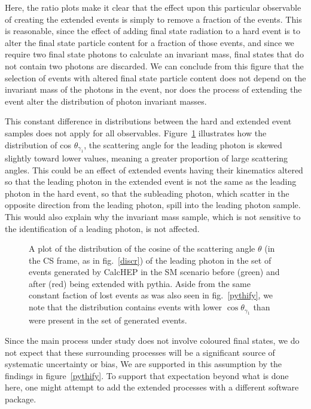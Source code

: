 Here, the ratio plots make it clear that the effect upon this particular observable of creating the extended events is simply to remove a fraction of the events. This is reasonable, since the effect of adding final state radiation to a hard event is to alter the final state particle content for a fraction of those events, and since we require two final state photons to calculate an invariant mass, final states that do not contain two photons are discarded. We can conclude from this figure that the selection of events with altered final state particle content does not depend on the invariant mass of the photons in the event, nor does the process of extending the event alter the distribution of photon invariant masses.

This constant difference in distributions between the hard and extended event samples does not apply for all observables. Figure~\ref{pythicos} illustrates how the distribution of cos $\theta_{\gamma_1}$, the scattering angle for the leading photon is skewed slightly toward lower values, meaning a greater proportion of large scattering angles. This could be an effect of extended events having their kinematics altered so that the leading photon in the extended event is not the same as the leading photon in the hard event, so that the subleading photon, which scatter in the opposite direction from the leading photon, spill into the leading photon sample. This would also explain why the invariant mass sample, which is not sensitive to the identification of a leading photon, is not affected.

\begin{figure}[htp]
\begin{minipage}[b]{.65\textwidth}
\begin{infilsf} \tiny \makebox[0pt][l]{
\hspace{-1em}
}\end{infilsf}
\end{minipage}
\hfill\begin{minipage}[b]{.3\textwidth}
\caption{A plot of the distribution of the cosine of the scattering angle $\theta$ (in the CS frame, as in fig.~\ref{discr}) of the leading photon in the set of events generated by CalcHEP in the SM scenario before (green) and after (red) being extended with pythia. Aside from the same constant faction of lost events as was also seen in fig.~\ref{pythify}, we note that the distribution contains events with lower $\cos\theta_{\gamma_1}$ than were present in the set of generated events.
\label{pythicos}}
\end{minipage}
\end{figure}

Since the main process under study does not involve coloured final states, we do not expect that these surrounding processes will be a significant source of systematic uncertainty or bias, We are supported in this assumption by the findings in figure~\ref{pythify}. To support that expectation beyond what is done here, one might attempt to add the extended processes with a different software package.

